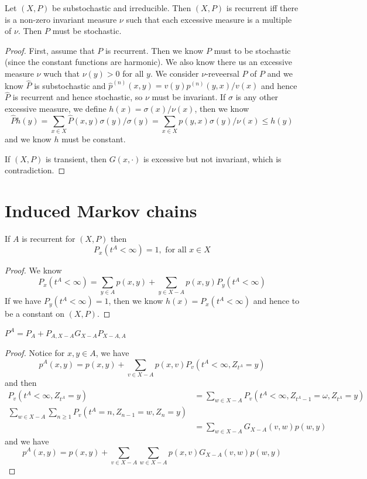 \documentclass[lang=en,11pt,a4paper,citestyle =authoryear]{elegantpaper}
\begin{document}
\begin{theorem}
    Let $(X,P)$ be substochastic and irreducible. Then $(X,P)$ is recurrent iff there is a non-zero invariant measure $\nu$ such that each excessive measure is a multiple of $\nu$. Then $P$ must be stochastic.
\end{theorem}
\begin{proof}
    First, assume that $P$ is recurrent. Then we know $P$ must to be stochastic (since the constant functions are harmonic). We also know there us an excessive measure $\nu$ wuch that $\nu(y) > 0$ for all $y$. We consider $\nu$-reveersal $\hat{P}$ of $P$ and we know $\hat{P}$ is substochastic and $\hat{p}^{(n)}(x,y) = v(y)p^{(n)}(y,x)/v(x)$ and hence $\hat{P}$ is recurrent and hence stochastic, so $\nu$ must be invariant. If $\sigma$ is any other excessive measure, we define $h(x) = \sigma(x)/\nu(x)$, then we know
    \[
    \hat{P}h(y) = \sum\limits_{x\in X}\hat{P}(x,y)\sigma(y)/\sigma(y) = \sum\limits_{x\in X} p(y,x)\sigma(y)/\nu(x) \leq h(y)    \]
    and we know $h$ must be constant.\par
    If $(X,P)$ is transient, then $G(x,\cdot)$ is excessive but not invariant, which is contradiction.
\end{proof}

\section{Induced Markov chains}

\begin{lemma}
    If $A$ is recurrent for $(X,P)$ then
    \[P_x(t^A < \infty) = 1,\text{ for all }x\in X\]
\end{lemma}
\begin{proof}
    We know
    \[
    P_x(t^A < \infty) = \sum\limits_{y\in A}p(x,y) + \sum\limits_{y\in X-A}p(x,y)P_y(t^A < \infty)
    \]
    If we have $P_y(t^A < \infty)= 1$, then we know $h(x) = P_x(t^A < \infty)$ and hence to be a constant on $(X,P)$.
\end{proof}

\begin{lemma}
    $P^A = P_A + P_{A,X-A}G_{X-A}P_{X-A,A}$
\end{lemma}
\begin{proof}
    Notice for $x,y\in A$, we have
    \[
    p^A(x,y) = p(x,y)+ \sum\limits_{v\in X-A}p(x,v)P_v(t^A<\infty, Z_{t^A} = y)
    \]
    and then
    \[
    \begin{aligned}
    P_v(t^A < \infty,Z_{t^A} = y) &= \sum\limits_{w\in X-A} P_v(t^A<\infty, Z_{t^A - 1} = \omega, Z_{t^A} = y)\\
    \sum\limits_{w\in X-A} \sum\limits_{n\geq 1}P_v(t^A = n, Z_{n-1} = w, Z_n = y) \\ &= \sum\limits_{w\in X-A}G_{X-A}(v,w)p(w,y)
    \end{aligned}
    \]
    and we have
    \[
    p^{A}(x,y) = p(x,y) + \sum\limits_{v\in X-A}\sum\limits_{w \in X-A}p(x,v)G_{X-A}(v,w)p(w,y)
    \]
\end{proof}
\end{document}
